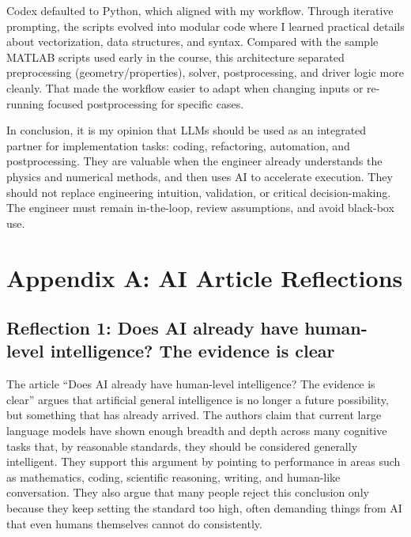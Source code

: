 \documentclass{article}
\begin{document}
Codex defaulted to Python, which aligned with my workflow. Through iterative prompting, the scripts evolved into modular code where I learned practical details about vectorization, data structures, and syntax. Compared with the sample MATLAB scripts used early in the course, this architecture separated preprocessing (geometry/properties), solver, postprocessing, and driver logic more cleanly. That made the workflow easier to adapt when changing inputs or re-running focused postprocessing for specific cases.

In conclusion, it is my opinion that LLMs should be used as an integrated partner for implementation tasks: coding, refactoring, automation, and postprocessing. They are valuable when the engineer already understands the physics and numerical methods, and then uses AI to accelerate execution. They should not replace engineering intuition, validation, or critical decision-making. The engineer must remain in-the-loop, review assumptions, and avoid black-box use.

\clearpage
\onecolumn



\clearpage
\appendix
\label{sec:appA}
\section*{Appendix A: AI Article Reflections}
\subsection*{Reflection 1: Does AI already have human-level intelligence? The evidence is clear}
The article “Does AI already have human-level intelligence? The evidence is clear” argues that artificial general intelligence is no longer a future possibility, but something that has already arrived. The authors claim that current large language models have shown enough breadth and depth across many cognitive tasks that, by reasonable standards, they should be considered generally intelligent. They support this argument by pointing to performance in areas such as mathematics, coding, scientific reasoning, writing, and human-like conversation. They also argue that many people reject this conclusion only because they keep setting the standard too high, often demanding things from AI that even humans themselves cannot do consistently.
\end{document}
